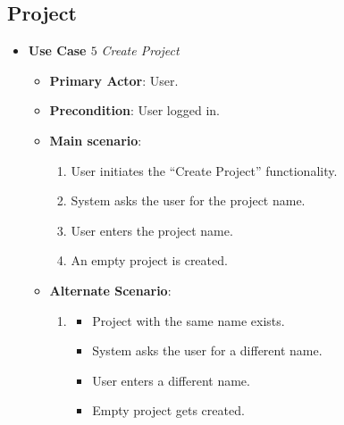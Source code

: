 \documentclass{report}
\begin{document}
\subsection{Project}
\begin{tcolorbox}[colframe=white, colback=lightgreen, arc=8pt]
\begin{itemize}
    \item \textbf{Use Case $5$} \textit{Create Project
}\\
    \begin{itemize}
        \item \textbf{Primary Actor}: User.
        \item \textbf{Precondition}: User logged in.
        \item \textbf{Main scenario}: \begin{enumerate}
            \item User initiates the “Create Project” functionality. 
            \item System asks the user for the project name.
            \item User enters the project name.
            \item An empty project is created.
        \end{enumerate}
       \item \textbf{Alternate Scenario}: 
       \begin{enumerate}
           \item 
           \begin{itemize} 
           \item Project with the same name exists.
            \item System asks the user for a different name.
            \item User enters a different name.
            \item Empty project gets created.
           \end{itemize}
       \end{enumerate}
    \end{itemize}
\end{itemize}   


\end{tcolorbox}
\end{document}
